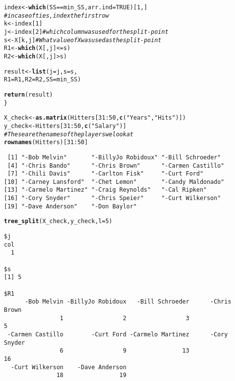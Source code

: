\documentclass[10pt, a4paper, english]{article}\usepackage[]{graphicx}\usepackage[dvipsnames]{xcolor}
\makeatletter
\newcommand{\hlnum}[1]{\textcolor[rgb]{0.686,0.059,0.569}{#1}}%
\newcommand{\hlstr}[1]{\textcolor[rgb]{0.192,0.494,0.8}{#1}}%
\newcommand{\hlcom}[1]{\textcolor[rgb]{0.678,0.584,0.686}{\textit{#1}}}%
\newcommand{\hlopt}[1]{\textcolor[rgb]{0,0,0}{#1}}%
\newcommand{\hlstd}[1]{\textcolor[rgb]{0.345,0.345,0.345}{#1}}%
\newcommand{\hlkwb}[1]{\textcolor[rgb]{0.69,0.353,0.396}{#1}}%
\newcommand{\hlkwc}[1]{\textcolor[rgb]{0.333,0.667,0.333}{#1}}%
\newcommand{\hlkwd}[1]{\textcolor[rgb]{0.737,0.353,0.396}{\textbf{#1}}}%
\newenvironment{kframe}{%
 \def\at@end@of@kframe{}%
 \ifinner\ifhmode%
  \def\at@end@of@kframe{\end{minipage}}%
  \begin{minipage}{\columnwidth}%
 \fi\fi%
 \def\FrameCommand##1{\hskip\@totalleftmargin \hskip-\fboxsep
 \colorbox{shadecolor}{##1}\hskip-\fboxsep
     \hskip-\linewidth \hskip-\@totalleftmargin \hskip\columnwidth}%
 \MakeFramed {\advance\hsize-\width
   \@totalleftmargin\z@ \linewidth\hsize
   \@setminipage}}%
 {\par\unskip\endMakeFramed%
 \at@end@of@kframe}
\newenvironment{knitrout}{}{} %
\makeatother
\begin{document}
\begin{knitrout}
\begin{kframe}
\begin{alltt}
 \hlstd{index} \hlkwb{<-} \hlkwd{which}\hlstd{(SS} \hlopt{==} \hlstd{min_SS,} \hlkwc{arr.ind} \hlstd{=} \hlnum{TRUE}\hlstd{)[}\hlnum{1}\hlstd{,]}
 \hlcom{#in case of ties,  index the first row}
  \hlstd{k} \hlkwb{<-} \hlstd{index[}\hlnum{1}\hlstd{]}
  \hlstd{j} \hlkwb{<-} \hlstd{index[}\hlnum{2}\hlstd{]} \hlcom{#which column was used for the split-point}
  \hlstd{s} \hlkwb{<-} \hlstd{X[k,j]}\hlcom{# What value of X was used as the split-point}
  \hlstd{R1} \hlkwb{<-} \hlkwd{which}\hlstd{(X[,j]} \hlopt{<=} \hlstd{s)}
  \hlstd{R2} \hlkwb{<-} \hlkwd{which}\hlstd{(X[,j]} \hlopt{>} \hlstd{s)}

  \hlstd{result} \hlkwb{<-} \hlkwd{list}\hlstd{(}\hlkwc{j}\hlstd{=j,} \hlkwc{s} \hlstd{= s,}
                 \hlkwc{R1} \hlstd{= R1,} \hlkwc{R2} \hlstd{= R2,}  \hlkwc{SS} \hlstd{= min_SS)}

  \hlkwd{return}\hlstd{(result)}
  \hlstd{\}}

\hlstd{X_check} \hlkwb{<-} \hlkwd{as.matrix}\hlstd{(Hitters[}\hlnum{31}\hlopt{:} \hlnum{50}\hlstd{,} \hlkwd{c}\hlstd{(}\hlstr{"Years"}\hlstd{,} \hlstr{"Hits"}\hlstd{)])}
\hlstd{y_check} \hlkwb{<-} \hlstd{Hitters[}\hlnum{31}\hlopt{:} \hlnum{50}\hlstd{,} \hlkwd{c}\hlstd{(}\hlstr{"Salary"}\hlstd{)]}
\hlcom{# These are the names of the players we look at }
\hlkwd{rownames}\hlstd{(Hitters)[}\hlnum{31}\hlopt{:} \hlnum{50}\hlstd{]}
\end{alltt}
\begin{verbatim}
 [1] "-Bob Melvin"       "-BillyJo Robidoux" "-Bill Schroeder"  
 [4] "-Chris Bando"      "-Chris Brown"      "-Carmen Castillo" 
 [7] "-Chili Davis"      "-Carlton Fisk"     "-Curt Ford"       
[10] "-Carney Lansford"  "-Chet Lemon"       "-Candy Maldonado" 
[13] "-Carmelo Martinez" "-Craig Reynolds"   "-Cal Ripken"      
[16] "-Cory Snyder"      "-Chris Speier"     "-Curt Wilkerson"  
[19] "-Dave Anderson"    "-Don Baylor"      
\end{verbatim}
\begin{alltt}
\hlkwd{tree_split}\hlstd{(X_check, y_check,} \hlkwc{l} \hlstd{=} \hlnum{5}\hlstd{)}
\end{alltt}
\begin{verbatim}
$j
col 
  1 

$s
[1] 5

$R1
      -Bob Melvin -BillyJo Robidoux   -Bill Schroeder      -Chris Brown 
                1                 2                 3                 5 
 -Carmen Castillo        -Curt Ford -Carmelo Martinez      -Cory Snyder 
                6                 9                13                16 
  -Curt Wilkerson    -Dave Anderson 
               18                19 


\end{verbatim}
\end{kframe}
\end{knitrout}
\end{document}
